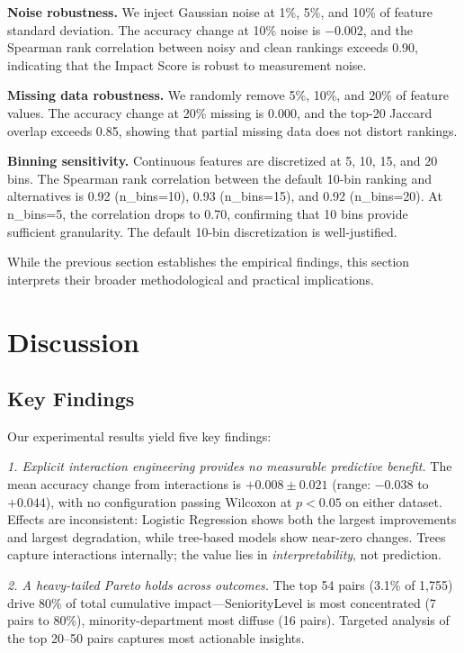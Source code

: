 \documentclass[conference]{IEEEtran}
\begin{document}
\textbf{Noise robustness.} We inject Gaussian noise at 1\%, 5\%, and 10\% of feature standard deviation. The accuracy change at 10\% noise is $-$0.002, and the Spearman rank correlation between noisy and clean rankings exceeds 0.90, indicating that the Impact Score is robust to measurement noise.

\textbf{Missing data robustness.} We randomly remove 5\%, 10\%, and 20\% of feature values. The accuracy change at 20\% missing is 0.000, and the top-20 Jaccard overlap exceeds 0.85, showing that partial missing data does not distort rankings.

\textbf{Binning sensitivity.} Continuous features are discretized at 5, 10, 15, and 20 bins. The Spearman rank correlation between the default 10-bin ranking and alternatives is 0.92 (n\_bins=10), 0.93 (n\_bins=15), and 0.92 (n\_bins=20). At n\_bins=5, the correlation drops to 0.70, confirming that 10 bins provide sufficient granularity. The default 10-bin discretization is well-justified.

While the previous section establishes the empirical findings, this section interprets their broader methodological and practical implications.

\section{Discussion}
\label{sec:discussion}

\subsection{Key Findings}

Our experimental results yield five key findings:

\textit{1. Explicit interaction engineering provides no measurable predictive benefit.} The mean accuracy change from interactions is $+0.008\pm0.021$ (range: $-0.038$ to $+0.044$), with no configuration passing Wilcoxon at $p<0.05$ on either dataset. Effects are inconsistent: Logistic Regression shows both the largest improvements and largest degradation, while tree-based models show near-zero changes. Trees capture interactions internally; the value lies in \textit{interpretability}, not prediction.

\textit{2. A heavy-tailed Pareto holds across outcomes.} The top 54 pairs (3.1\% of 1,755) drive 80\% of total cumulative impact---SeniorityLevel is most concentrated (7 pairs to 80\%), minority-department most diffuse (16 pairs). Targeted analysis of the top 20--50 pairs captures most actionable insights.
\end{document}
